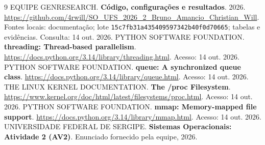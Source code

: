 \documentclass[12pt,a4paper]{article}
\begin{document}
  \begingroup
  \renewcommand{\section}[2]{}
  \begin{singlespace}\footnotesize
  \begin{thebibliography}{9}
   EQUIPE GENRESEARCH. \textbf{Código, configurações e resultados}. 2026. \url{https://github.com/4rwill/SO_UFS_2026_2_Bruno_Amancio_Christian_Will}. Fontes locais: documentação; lote \texttt{15c7fb31a435409597342b40f0d70665}; tabelas e evidências. Consulta: 14 out. 2026.
   PYTHON SOFTWARE FOUNDATION. \textbf{threading: Thread-based parallelism}. \url{https://docs.python.org/3.14/library/threading.html}. Acesso: 14 out. 2026.
   PYTHON SOFTWARE FOUNDATION. \textbf{queue: A synchronized queue class}. \url{https://docs.python.org/3.14/library/queue.html}. Acesso: 14 out. 2026.
   THE LINUX KERNEL DOCUMENTATION. \textbf{The /proc Filesystem}. \url{https://www.kernel.org/doc/html/latest/filesystems/proc.html}. Acesso: 14 out. 2026.
   PYTHON SOFTWARE FOUNDATION. \textbf{mmap: Memory-mapped file support}. \url{https://docs.python.org/3.14/library/mmap.html}. Acesso: 14 out. 2026.
   UNIVERSIDADE FEDERAL DE SERGIPE. \textbf{Sistemas Operacionais: Atividade 2 (AV2)}. Enunciado fornecido pela equipe, 2026.
  \end{thebibliography}\end{singlespace}
  \endgroup
  
\end{document}
